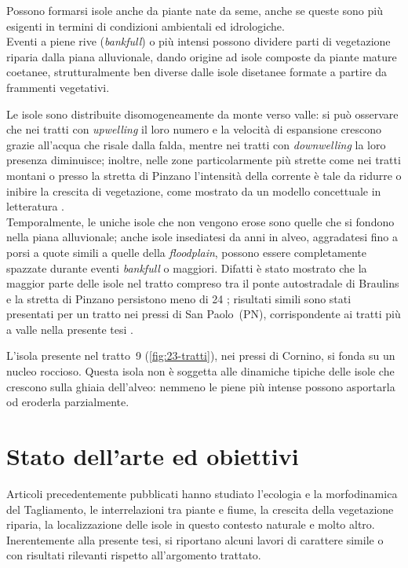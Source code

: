 Possono formarsi isole anche da piante nate da seme, anche se queste sono più esigenti in termini di condizioni ambientali ed idrologiche.
\\
Eventi a piene rive (\emph{bankfull}) o più intensi possono dividere parti di vegetazione riparia dalla piana alluvionale, dando origine ad isole composte da piante mature coetanee, strutturalmente ben diverse dalle isole disetanee formate a partire da frammenti vegetativi.

Le isole sono distribuite disomogeneamente da monte verso valle: si può osservare che nei tratti con \emph{upwelling} il loro numero e la velocità di espansione crescono grazie all'acqua che risale dalla falda, mentre nei tratti con \emph{downwelling} la loro presenza diminuisce;
inoltre, nelle zone particolarmente più strette come nei tratti montani o presso la stretta di Pinzano l'intensità della corrente è tale da ridurre o inibire la crescita di vegetazione, come mostrato da un modello concettuale in letteratura .
\\
Temporalmente, le uniche isole che non vengono erose sono quelle che si fondono nella piana alluvionale; anche isole insediatesi da anni in alveo, aggradatesi fino a porsi a quote simili a quelle della \emph{floodplain}, possono essere completamente spazzate durante eventi \emph{bankfull} o maggiori.
Difatti è stato mostrato che la maggior parte delle isole nel tratto compreso tra il ponte autostradale di Braulins e la stretta di Pinzano persistono meno di \SI{24}{\anni} ; risultati simili sono stati presentati per un tratto nei pressi di San Paolo~(PN), corrispondente ai tratti più a valle nella presente tesi .

L'isola presente nel tratto~9 (\cref{fig:23-tratti}), nei pressi di Cornino, si fonda su un nucleo roccioso.
Questa isola non è soggetta alle dinamiche tipiche delle isole che crescono sulla ghiaia dell'alveo: nemmeno le piene più intense possono asportarla od eroderla parzialmente.


\section{Stato dell'arte ed obiettivi}
Articoli precedentemente pubblicati hanno studiato l'ecologia e la morfodinamica del Tagliamento, le interrelazioni tra piante e fiume, la crescita della vegetazione riparia, la localizzazione delle isole in questo contesto naturale e molto altro.
\\
Inerentemente alla presente tesi, si riportano alcuni lavori di carattere simile o con risultati rilevanti rispetto all'argomento trattato.

